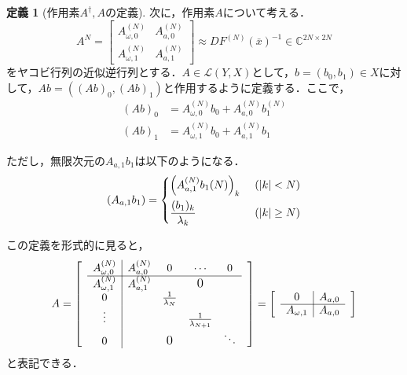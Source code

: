 \documentclass[11pt,a4paper,titlepage]{jsreport}
\theoremstyle{definition}
\newtheorem{dfn}{定義}
\begin{document}
\begin{dfn}[作用素$A^\dagger,A$の定義]
  次に，$作用素A$について考える．
  \begin{equation*}
    A^{N} = \begin{bmatrix}
      A_{\omega,0}^{(N)} & A_{a,0}^{(N)} \\
      A_{\omega,1}^{(N)} & A_{a,1}^{(N)}
    \end{bmatrix}
    \approx DF^{(N)} \left(\bar{x}\right)^{-1} \in \mathbb{C}^{2N\times 2N}
  \end{equation*}
  をヤコビ行列の近似逆行列とする．$A\in\mathcal{L}(Y,X)$として，$b=\left(b_0,b_1\right)\in X$に対して，$Ab=\left((Ab)_0,(Ab)_1\right)$と作用するように定義する．ここで，
  \begin{align*}
    (Ab)_0 & = A_{\omega,0}^{(N)}b_0 + A_{a,0}^{(N)} b_1^{(N)} \\
    (Ab)_1 & = A_{\omega,1}^{(N)}b_0 + A_{a,1}^{(N)} b_1
  \end{align*}

  ただし，無限次元の$A_{a,1}b_1$は以下のようになる．
  \begin{equation*}
    \left(A_{a,1}b_1\right)=\begin{dcases}
      \left(A_{a,1}^{(N)}b_1{(N)}\right)_k & \ (|k|<N)     \\
      \frac{(b_1)_k}{\lambda_k}            & \ (|k|\geq N)
    \end{dcases}
  \end{equation*}

  この定義を形式的に見ると，
  \begin{equation*}
    A =
    \begin{bmatrix}
       & \multicolumn{1}{c|}{A_{\omega,0}^{(N)}} & A_{a,0}^{(N)} & 0                   & \cdots                  & 0      & \\ \cline{2-6}
       & \multicolumn{1}{c|}{A_{\omega,1}^{(N)}} & A_{a,1}^{(N)} &                     & \text{\large{0}}        &        & \\
       & \multicolumn{1}{c|}{0}                  &               & \frac{1}{\lambda_N} &                         &        & \\
       & \multicolumn{1}{c|}{\vdots}             &               &                     & \frac{1}{\lambda_{N+1}} &        & \\
       & \multicolumn{1}{c|}{0}                  &               & \text{\large{0}}    &                         & \ddots & \\
    \end{bmatrix}
    =
    \begin{bmatrix}
       & \multicolumn{1}{c|}{0}            & A_{a,0} & \\ \cline{2-3}
       & \multicolumn{1}{c|}{A_{\omega,1}} & A_{a,0} &
    \end{bmatrix}
  \end{equation*}
  と表記できる．
\end{dfn}
\end{document}
